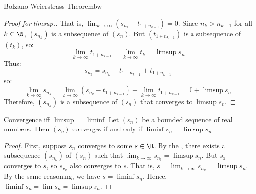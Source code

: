 \begin{thmbox}{Bolzano-Weierstrass Theorem}{bw}
\begin{proof}[Proof for limsup.]
        That is, $\lim_{k \to \infty} \left( s_{n_k} - t_{1+ n_{k-1}} \right) = 0$. Since $n_k > n_{k-1}$ for all $k \in \N$, $(s_{n_k})$ is a subsequence of $(s_n)$. But $(t_{1 + n_{k-1}})$ is a subsequence of $(t_k)$, so:
        \[ \lim_{k \to \infty} t_{1 + n_{k-1}} = \lim_{k \to \infty} t_k = \limsup s_n \]
        Thus:
        \[ s_{n_k} = s_{n_k} - t_{1 + n_{k-1}} + t_{1 + n_{k-1}} \]
        so:
        \[ \lim_{k \to \infty} s_{n_k} = \lim_{k \to\infty} \left( s_{n_k} - t_{1 + n_{k-1}} \right) + \lim_{k \to \infty} t_{1 + n_{k-1}} = 0 + \limsup s_n \]
        Therefore, $(s_{n_k})$ is a subsequence of $(s_n)$ that converges to $\limsup s_n$.
    \end{proof}
\end{thmbox}

\begin{thmbox}{Convergence iff $\limsup = \liminf$}{}
    Let $(s_n)$ be a bounded sequence of real numbers. Then $(s_n)$ converges if and only if $\liminf s_n = \limsup s_n$
    \tcblower
    \begin{proof}
        First, suppose $s_n$ converges to some $s \in \R$. By the , there exists a subsequence $(s_{n_k})$ of $(s_n)$ such that $\lim_{k \to \infty} s_{n_k} = \limsup s_n$. But $s_n$ converges to $s$, so $s_{n_k}$ also converges to $s$. That is, $s = \lim_{k \to \infty} s_{n_k} = \limsup s_n$. By the same reasoning, we have $s = \liminf s_n$. Hence, $\liminf s_n = \lim s_n = \limsup s_n$.
    \end{proof}
\end{thmbox}
